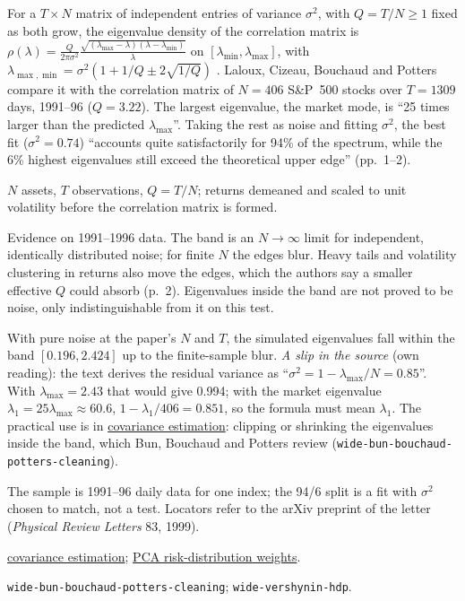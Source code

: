 \begin{qfevidence}\label{ev:correlation-matrix-noise}
 For a $T\times N$ matrix of independent entries of variance $\sigma^2$, with $Q=T/N\ge1$ fixed as both grow, the eigenvalue density of the correlation matrix is $\rho(\lambda)=\frac{Q}{2\pi\sigma^2}\frac{\sqrt{(\lambda_{\max}-\lambda)(\lambda-\lambda_{\min})}}{\lambda}$ on $[\lambda_{\min},\lambda_{\max}]$, with $\lambda_{\max,\min}=\sigma^2(1+1/Q\pm2\sqrt{1/Q})$ \citep[arXiv cond-mat/9810255v1, eq.~(3), p.~1]{wide-laloux-noise-dressing}. Laloux, Cizeau, Bouchaud and Potters compare it with the correlation matrix of $N=406$ S\&P~500 stocks over $T=1309$ days, 1991--96 ($Q=3.22$). The largest eigenvalue, the market mode, is ``25 times larger than the predicted $\lambda_{\max}$''. Taking the rest as noise and fitting $\sigma^2$, the best fit ($\sigma^2=0.74$) ``accounts quite satisfactorily for 94\% of the spectrum, while the 6\% highest eigenvalues still exceed the theoretical upper edge'' (pp.~1--2).

 $N$ assets, $T$ observations, $Q=T/N$; returns demeaned and scaled to unit volatility before the correlation matrix is formed.

 Evidence on 1991--1996 data. The band is an $N\to\infty$ limit for independent, identically distributed noise; for finite $N$ the edges blur. Heavy tails and volatility clustering in returns also move the edges, which the authors say a smaller effective $Q$ could absorb (p.~2). Eigenvalues inside the band are not proved to be noise, only indistinguishable from it on this test.

 With pure noise at the paper's $N$ and $T$, the simulated eigenvalues fall within the band $[0.196,2.424]$ up to the finite-sample blur. \emph{A slip in the source} (own reading): the text derives the residual variance as ``$\sigma^2=1-\lambda_{\max}/N=0.85$''. With $\lambda_{\max}=2.43$ that would give 0.994; with the market eigenvalue $\lambda_1=25\lambda_{\max}\approx60.6$, $1-\lambda_1/406=0.851$, so the formula must mean $\lambda_1$. The practical use is in \hyperref[meth:portfolio-covariance-estimation]{covariance estimation}: clipping or shrinking the eigenvalues inside the band, which Bun, Bouchaud and Potters review (\nolinkurl{wide-bun-bouchaud-potters-cleaning}).

 The sample is 1991--96 daily data for one index; the 94/6 split is a fit with $\sigma^2$ chosen to match, not a test. Locators refer to the arXiv preprint of the letter (\emph{Physical Review Letters} 83, 1999).

 \hyperref[meth:portfolio-covariance-estimation]{covariance estimation}; \hyperref[mod:pca-risk-distribution-weights]{PCA risk-distribution weights}.

 \nolinkurl{wide-bun-bouchaud-potters-cleaning}; \nolinkurl{wide-vershynin-hdp}.

\end{qfevidence}
